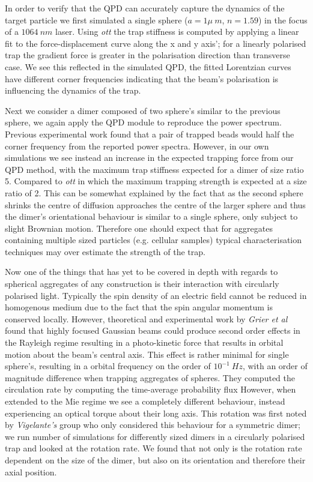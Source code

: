 \documentclass[a4paper,oneside,11pt]{book}
\begin{document}
In order to verify that the QPD can accurately capture the dynamics of the target particle we first simulated a single sphere ($a = 1\mu\ m$, $n=1.59$) in the focus of a $1064\ nm$ laser. Using \textit{ott} the trap stiffness is computed by applying a linear fit to the force-displacement curve along the x and y axis'; for a linearly polarised trap the gradient force is greater in the polarisation direction than transverse case. We see this reflected in the simulated QPD, the fitted Lorentzian curves have different corner frequencies indicating that the beam's polarisation is influencing the dynamics of the trap. 

Next we consider a dimer composed of two sphere's similar to the previous sphere, we again apply the QPD module to reproduce the power spectrum. Previous experimental work found that a pair of trapped beads would half the corner frequency from the reported power spectra. However, in our own simulations we see instead an increase in the expected trapping force from our QPD method, with the maximum trap stiffness expected for a dimer of size ratio 5. Compared to \textit{ott} in which the maximum trapping strength is expected at a size ratio of 2. This can be somewhat explained by the fact that as the second sphere shrinks the centre of diffusion approaches the centre of the larger sphere and thus the dimer's orientational behaviour is similar to a single sphere, only subject to slight Brownian motion. Therefore one should expect that for aggregates containing multiple sized particles (e.g. cellular samples) typical characterisation techniques may over estimate the strength of the trap.

Now one of the things that has yet to be covered in depth with regards to spherical aggregates of any construction is their interaction with circularly polarised light. Typically the spin density of an electric field cannot be reduced in homogenous medium due to the fact that the spin angular momentum is conserved locally. However, theoretical and experimental work by \textit{Grier et al} found that highly focused Gaussian beams could produce second order effects in the Rayleigh regime resulting in a photo-kinetic force that results in orbital motion about the beam's central axis. This effect is rather minimal for single sphere's, resulting in a orbital frequency on the order of $10^{-1}\ Hz$, with an order of magnitude difference when trapping aggregates of spheres. They computed the circulation rate by computing the time-average probability flux However, when extended to the Mie regime we see a completely different behaviour, instead experiencing an optical torque about their long axis. This rotation was first noted by \textit{Vigelante's} group who only considered this behaviour for a symmetric dimer; we run number of simulations for differently sized dimers in a circularly polarised trap and looked at the rotation rate. We found that not only is the rotation rate dependent on the size of the dimer, but also on its orientation and therefore their axial position.
\end{document}
